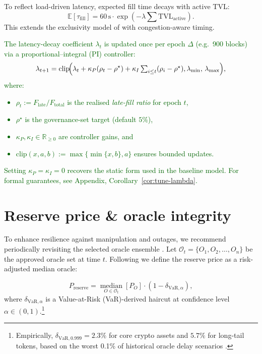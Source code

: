 \documentclass[11pt]{article}
\begin{document}
To reflect load-driven latency, expected fill time decays with active TVL:
\[
\mathbb{E}[\tau_{\text{fill}}] = 60\,\text{s} \cdot \exp\left(-\lambda \sum \text{TVL}_{\text{active}}\right).
\]
This extends the exclusivity model of \textcite{stableunit2025spec} with congestion-aware timing.
\textcolor{darkgreen}{The latency-decay coefficient \(\lambda_t\) is updated once per epoch \(\Delta\) (e.g.\ 900 blocks) via a proportional–integral (PI) controller:
\[
\lambda_{t+1} =
\mathrm{clip}\!\Bigl(
  \lambda_t + \kappa_P(\rho_t-\rho^\star)
            + \kappa_I \textstyle\sum_{i\le t}(\rho_i-\rho^\star),
  \lambda_{\min},\,\lambda_{\max}\Bigr),
\]
where:
\begin{itemize}[itemsep=0pt,topsep=2pt,leftmargin=15pt]
  \item \(\rho_t := F_{\text{late}} / F_{\text{total}}\) is the realised \emph{late-fill ratio} for epoch \(t\),
  \item \(\rho^\star\) is the governance-set target (default \(5\%\)),
  \item \(\kappa_P, \kappa_I \in \mathbb{R}_{\ge 0}\) are controller gains, and
  \item \(\mathrm{clip}(x, a, b) := \max\{\min\{x, b\}, a\}\) ensures bounded updates.
\end{itemize}
Setting \(\kappa_P = \kappa_I = 0\) recovers the static form used in the baseline model.  
For formal guarantees, see Appendix, Corollary~\ref{cor:tune-lambda}.}

\section{Reserve price \& oracle integrity}
\label{sec:reserve}
To enhance resilience against manipulation and outages, we recommend periodically revisiting the selected oracle ensemble \parencite{deng2024safeguarding}. Let \(\mathcal{O}_t = \{O_{1}, O_{2}, \dots, O_{n}\}\) be the approved oracle set at time \(t\). Following \textcite{eskandari2021sok} we define the reserve price as a risk-adjusted median oracle:

\[
P_{\text{reserve}} = \operatorname*{median}_{O \in \mathcal{O}_t} \left[ P_{O} \right] \cdot (1 - \delta_{\text{VaR}, \alpha}),
\]
where \(\delta_{\text{VaR}, \alpha}\) is a Value-at-Risk (VaR)-derived haircut at confidence level \(\alpha \in (0,1)\).\footnote{Empirically, \(\delta_{\text{VaR}, 0.999} = 2.3\%\) for core crypto assets and \(5.7\%\) for long-tail tokens, based on the worst 0.1\% of historical oracle delay scenarios \parencite[Fig.~10]{tian2025defi}.}
\end{document}
